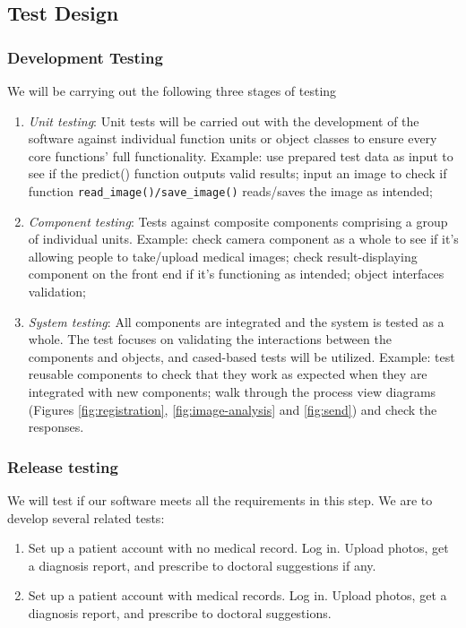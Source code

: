 \documentclass[11pt,bibliography=totocnumbered]{article}
\begin{document}
  \subsection{Test Design}
  
  \subsubsection{Development Testing}
  We will be carrying out the following three stages of testing
  \begin{enumerate}
  	\item \emph{Unit testing}: Unit tests will be carried out with the development of the software against individual function units or object classes to ensure every core functions' full functionality. Example: use prepared test data as input to see if the predict() function outputs valid results; input an image to check if function \texttt{read\_image()/save\_image()} reads/saves the image as intended;
  	
  	\item \emph{Component testing}: Tests against composite components comprising a group of individual units. Example: check camera component as a whole to see if it’s allowing people to take/upload medical images; check result-displaying component on the front end if it’s functioning as intended; object interfaces validation;
  	
  	\item \emph{System testing}: All components are integrated and the system is tested as a whole. The test focuses on validating the interactions between the components and objects, and cased-based tests will be utilized. Example: test reusable components to check that they work as expected when they are integrated with new components; walk through the process view diagrams (Figures \eqref{fig:registration}, \eqref{fig:image-analysis} and \eqref{fig:send}) and check the responses.
  	
  \end{enumerate}
  
  \subsubsection{Release testing}
  
  We will test if our software meets all the requirements in this step. We are to develop several related tests:
  
  \begin{enumerate}
  	\item Set up a patient account with no medical record. Log in. Upload photos, get a diagnosis report, and prescribe to doctoral suggestions if any.
  	\item Set up a patient account with medical records. Log in. Upload photos, get a diagnosis report, and prescribe to doctoral suggestions. 
  \end{enumerate}
  
\end{document}
